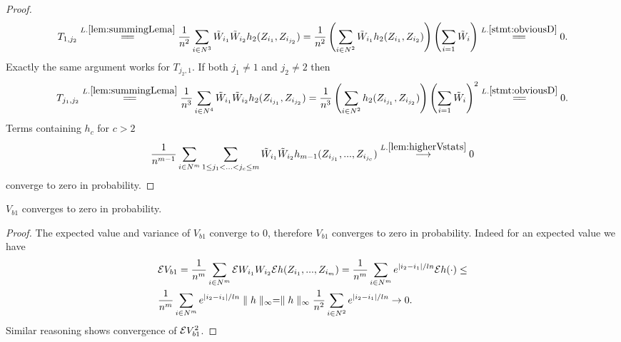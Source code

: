 \begin{proof}
\begin{align}
T_{1,j_2} \overset{L.\ref{lem:summingLema}}{=\joinrel=} \frac{1} {n^2}  \sum_{i \in N^3}  \tilde W_{i_1} \tilde W_{i_2} h_2(Z_{i_1},Z_{i_{j_2}}) = \frac{1} {n^2} \left( \sum_{i \in N^2}  \tilde W_{i_1}  h_2(Z_{i_1},Z_{i_2}) \right) \left( \sum_{i=1} \tilde W_i \right)  \overset{L.\ref{stmt:obviousD}}{=\joinrel=} 0.
\end{align}
Exactly the same argument works for $T_{j_2,1}$. If both $j_1 \neq 1$ and $j_2 \neq 2$ then 
\begin{align}
T_{j_1,j_2} \overset{L.\ref{lem:summingLema}}{=\joinrel=} \frac{1} {n^3}  \sum_{i \in N^4}  \tilde W_{i_1} \tilde W_{i_2} h_2(Z_{i_{j_1}},Z_{i_{j_2}}) = \frac{1} {n^3} \left( \sum_{i \in N^2}   h_2(Z_{i_{j_1}},Z_{i_{j_2}})\right) \left( \sum_{i=1} \tilde W_i \right)^2 \overset{L.\ref{stmt:obviousD}}{=\joinrel=}0.
\end{align}   
Terms containing $h_c$ for $c>2$ 
\begin{align}
\frac{1} {n^{m-1}}  \sum_{i \in N^m} \sum_{1 \leq j_1 < ...<j_{c} \leq m } \tilde W_{i_1} \tilde W_{i_2}  h_{m-1}(Z_{i_{j_1}},...,Z_{i_{j_{c}}}) \overset{L. \ref{lem:higherVstats}}{\longrightarrow} 0 
\end{align}
converge to zero in probability.
 \end{proof}
  
\begin{lemma}
\label{lem:degb2}
$ V_{b1}$ converges to zero in probability.  
\end{lemma}  
\begin{proof}
The expected value and variance of $V_{b1}$ converge to 0, therefore $V_{b1}$ converges to zero in probability. Indeed for an expected value we have
\begin{align}
& \mathcal{E} V_{b1} = \frac {1} {n^m} \sum_{i \in N^m} \mathcal{E} W_{i_1} W_{i_2} \mathcal{E} h(Z_{i_1},...,Z_{i_m}) =  \frac {1} {n^m} \sum_{i \in N^m}  e^{|i_2-i_1|/ln} \mathcal{E} h(\cdot) \leq   \\
&\frac {1} {n^m} \sum_{i \in N^m}  e^{|i_2-i_1|/ln} \parallel h \parallel_{\infty} =  \parallel h \parallel_{\infty} \frac {1} {n^2} \sum_{i \in N^2}  e^{|i_2-i_1|/ln}  \to 0.
\end{align}
Similar reasoning shows convergence of $\mathcal{E} V_{b1}^2$.
\end{proof}  
  
